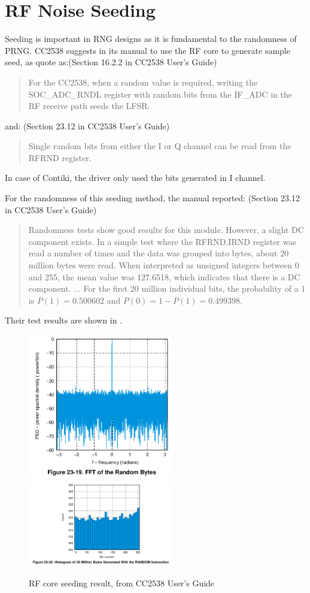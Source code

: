 \section{RF Noise Seeding} \label{Seed}

Seeding is important in RNG designs as it is fundamental to the randomness of PRNG. CC2538 suggests in its manual to  use the RF core to generate sample seed, as quote as:(Section 16.2.2 in CC2538 User's Guide\cite{CC2538Manual})
\begin{quote}
For the CC2538, when a random value is required, writing the SOC\_ADC\_RNDL register with random bits from the IF\_ADC in the RF receive path seeds the LFSR.
\end{quote}
and: (Section 23.12 in CC2538 User's Guide\cite{CC2538Manual})
\begin{quote}
Single random bits from either the I or Q channel can be read from the RFRND register.
\end{quote}
In case of Contiki, the driver only used the bits generated in I channel.

For the randomness of this seeding method, the manual\cite{CC2538Manual} reported: (Section 23.12 in CC2538 User's Guide\cite{CC2538Manual})
\begin{quote}
Randomness tests show good results for this module. However, a slight DC component exists. In a simple test where the RFRND.IRND register was read a number of times and the data was grouped into bytes, about 20 million bytes were read. When interpreted as unsigned integers between 0 and 255, the mean value was 127.6518, which indicates that there is a DC component.
...
For the first 20 million individual bits, the probability of a 1 is $P(1) = 0.500602$ and $P(0) = 1 - P(1) = 0.499398$.
\end{quote}

Their test results are shown in .

\begin{figure}[!t]
\centering
\includegraphics[width=2.5in]{fig/CC2538_Seed1.png}
\includegraphics[width=2.5in]{fig/CC2538_Seed2.png}
\caption{RF core seeding result, from CC2538 User's Guide}
\label{SeedResult}
\end{figure}

